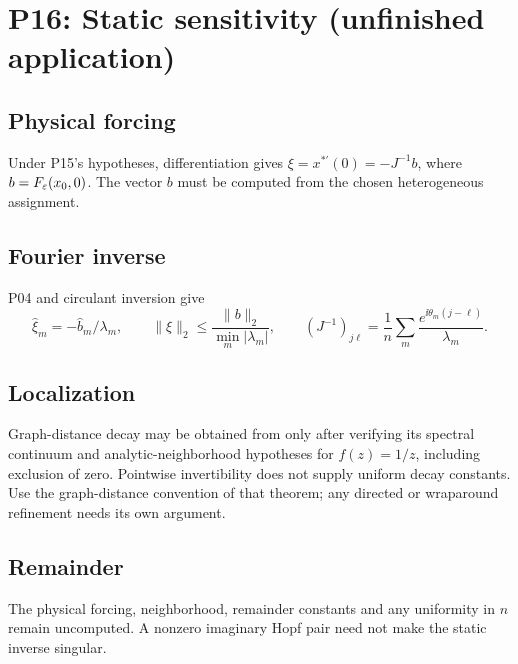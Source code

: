 \section{P16: Static sensitivity (unfinished application)}
\label{sec:P16}
\subsection{Physical forcing}\label{slot:P16-1}
Under P15's hypotheses, differentiation gives
$\xi=x^{*\prime}(0)=-J^{-1}b$, where $b=F_\varepsilon(x_0,0)$.
The vector $b$ must be computed from the chosen heterogeneous assignment.
\subsection{Fourier inverse}\label{slot:P16-2}
P04 and circulant inversion \cite[Theorem~3.1]{Gray2006} give
\[
 \widehat\xi_m=-\widehat b_m/\lambda_m,\qquad
 \|\xi\|_2\le\frac{\|b\|_2}{\min_m|\lambda_m|},\qquad
 (J^{-1})_{j\ell}=\frac1n\sum_m\frac{e^{\ii\theta_m(j-\ell)}}{\lambda_m}.
\]
\subsection{Localization}\label{slot:P16-3}
Graph-distance decay may be obtained from
\cite[Theorem~3.4]{BenziRazouk2007} only after verifying its spectral
continuum and analytic-neighborhood hypotheses for $f(z)=1/z$,
including exclusion of zero. Pointwise invertibility does not supply
uniform decay constants. Use the graph-distance convention of that theorem;
any directed or wraparound refinement needs its own argument.
\subsection{Remainder}\label{slot:P16-4}
The physical forcing, neighborhood, remainder constants and any uniformity
in $n$ remain uncomputed. A nonzero imaginary Hopf pair need not make
the static inverse singular.
